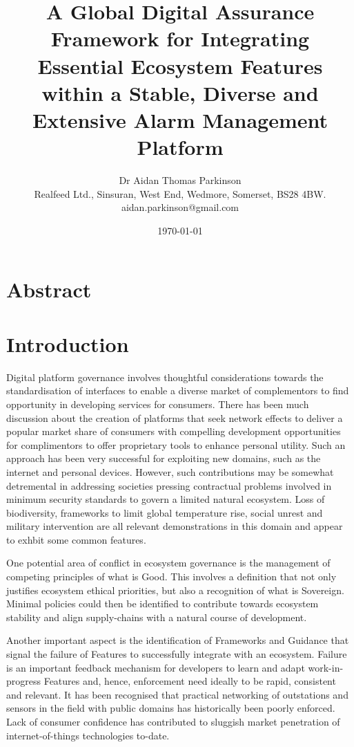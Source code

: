 \documentclass[11pt, oneside]{article}   	%
\title{A Global Digital Assurance Framework for Integrating Essential Ecosystem Features within a Stable, Diverse and Extensive Alarm Management Platform}
\author{Dr Aidan Thomas Parkinson\\ Realfeed Ltd., Sinsuran, West End, Wedmore, Somerset, BS28 4BW.\\ aidan.parkinson@gmail.com}
\date{\today}							%
\begin{document}
\maketitle

\section*{Abstract}

\pagebreak

\section{Introduction}
Digital platform governance involves thoughtful considerations towards the standardisation of interfaces to enable a diverse market of complementors to find opportunity in developing services for consumers.
There has been much discussion about the creation of platforms that seek network effects to deliver a popular market share of consumers with compelling development opportunities for complimentors to offer proprietary tools to enhance personal utility.
Such an approach has been very successful for exploiting new domains, such as the internet and personal devices.
However, such contributions may be somewhat detremental in addressing societies pressing contractual problems involved in minimum security standards to govern a limited natural ecosystem.
Loss of biodiversity, frameworks to limit global temperature rise, social unrest and military intervention are all relevant demonstrations in this domain and appear to exhbit some common features.\

One potential area of conflict in ecosystem governance is the management of competing principles of what is Good.
This involves a definition that not only justifies ecosystem ethical priorities, but also a recognition of what is Sovereign.
Minimal policies could then be identified to contribute towards ecosystem stability and align supply-chains with a natural course of development.\

Another important aspect is the identification of Frameworks and Guidance that signal the failure of Features to successfully integrate with an ecosystem.
Failure is an important feedback mechanism for developers to learn and adapt work-in-progress Features and, hence, enforcement need ideally to be rapid, consistent and relevant.
It has been recognised that practical networking of outstations and sensors in the field with public domains has historically been poorly enforced.
Lack of consumer confidence has contributed to sluggish market penetration of internet-of-things technologies to-date.\
\end{document}
